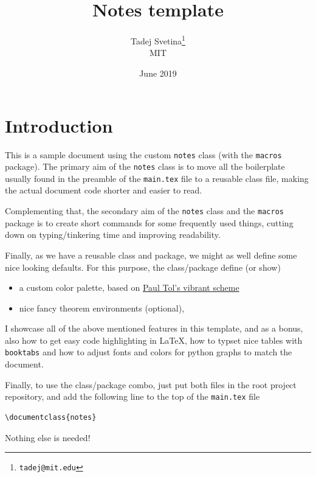 \documentclass[letterpaper,11pt]{notes}
\title{Notes template}
\author{Tadej Svetina\thanks{\tt tadej@mit.edu}\\MIT}
\date{June 2019}
\theoremstyle{definition}
\theoremstyle{plain}
\theoremstyle{remark}
\begin{document}
\maketitle

\section{Introduction}

This is a sample document using the custom \texttt{notes} class (with the \texttt{macros} package). The primary aim of the \texttt{notes} class is to move all the boilerplate usually found in the preamble of the \texttt{main.tex} file to a reusable class file, making the actual document code shorter and easier to read.

Complementing that, the secondary aim of the \texttt{notes} class and the \texttt{macros} package is to create short commands for some frequently used things, cutting down on typing/tinkering time and improving readability.

Finally, as we have a reusable class and package, we might as well define some nice looking defaults. For this purpose, the class/package define (or show)
\begin{itemize}
    \item a custom color palette, based on \href{https://personal.sron.nl/~pault/}{Paul Tol's vibrant scheme}
    \item nice fancy theorem environments (optional),
\end{itemize}

I showcase all of the above mentioned features in this template, and as a bonus, also how to get easy code highlighting in \LaTeX, how to typset nice tables with \texttt{booktabs} and how to adjust fonts and colors for python graphs to match the document. 

Finally, to use the class/package combo, just put both files in the root project repository, and add the following line to the top of the \texttt{main.tex} file
\begin{verbatim}
\documentclass{notes}
\end{verbatim}
Nothing else is needed!
\end{document}
